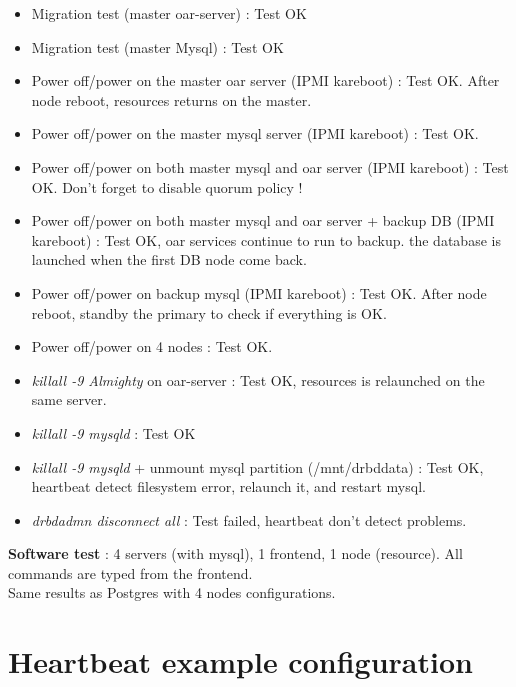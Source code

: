 \documentclass[a4paper,10pt]{report}
\begin{document}
\begin{itemize}
 \item Migration test (master oar-server) : Test OK
 \item Migration test (master Mysql) : Test OK
 \item Power off/power on the master oar server (IPMI kareboot) : Test OK. After node reboot, resources returns on the master.
 \item Power off/power on the master mysql server (IPMI kareboot) : Test OK.
 \item Power off/power on both master mysql and oar server (IPMI kareboot) : Test OK. Don't forget to disable quorum policy !
 \item Power off/power on both master mysql and oar server + backup DB (IPMI kareboot) : Test OK, oar services continue to run to backup. the database is launched when the first DB node come back.
 \item Power off/power on backup mysql (IPMI kareboot) : Test OK. After node reboot, standby the primary to check if everything is OK.
 \item Power off/power on 4 nodes : Test OK.
 \item \textit{killall -9 Almighty} on oar-server : Test OK, resources is relaunched on the same server.
 \item \textit{killall -9 mysqld} : Test OK
 \item \textit{killall -9 mysqld} + unmount mysql partition (/mnt/drbddata) : Test OK, heartbeat detect filesystem error, relaunch it, and restart mysql.
 \item \textit{drbdadmn disconnect all} : Test failed, heartbeat don't detect problems.
\end{itemize}

\textbf{Software test} : 4 servers (with mysql), 1 frontend, 1 node (resource). All commands are typed from the frontend.\\
Same results as Postgres with 4 nodes configurations.


















\appendix
\chapter{Heartbeat example configuration}
\label{cibexample}
\end{document}
